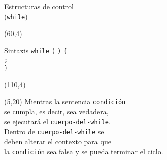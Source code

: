 \documentclass[aspectratio=169]{beamer}
\begin{document}
\begin{frame}[fragile,t]{Estructuras de control\\ (\texttt{while})}
    \begin{textblock}{45}(60,4)
    \begin{block}{\small Sintaxis}
    \vspace{0.2cm}
    \scriptsize
    {\large \texttt{while}} {\large \texttt{(}}
     {\large \texttt{)}} {\large \texttt{\{}}\\ \vspace{0.2cm}
    \hspace{0.7cm}  {\large \texttt{;}}\\ \vspace{0.2cm}
    \hspace{0.3cm} {\large \texttt{\}}}
    \end{block}
    \end{textblock}
    \begin{textblock}{45}(110,4)
    \end{textblock}
    \begin{textblock}{50}(5,20)
    \small
    Mientras la sentencia \texttt{condición}\\ se cumpla, es decir, sea vedadera,\\
    se ejecutará el \texttt{cuerpo-del-while}.\\
    \bigskip
    Dentro de \texttt{cuerpo-del-while} se\\ deben alterar el contexto para que\\ la \texttt{condición} sea falsa y se pueda terminar el ciclo.
    \end{textblock}

\end{frame}
\end{document}
